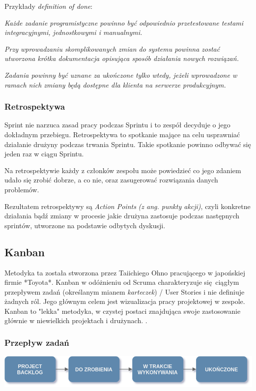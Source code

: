 \documentclass{article}
\begin{document}
Przykłady \textit{definition of done}:
\begin{center}
    \textit{Każde zadanie programistyczne powinno być odpowiednio przetestowane testami integracyjnymi, jednostkowymi i manualnymi.}

    \textit{Przy wprowadzaniu skomplikowanych zmian do systemu powinna zostać utworzona krótka dokumentacja opisująca sposób działania nowych rozwiązań.}

    \textit{Zadania powinny być uznane za ukończone tylko wtedy, jeżeli wprowadzone w ramach nich zmiany będą dostępne dla klienta na serwerze produkcyjnym.}
\end{center}

\subsubsection*{Retrospektywa}
Sprint nie narzuca zasad pracy podczas Sprintu i to zespół decyduje o jego dokładnym przebiegu. Retrospektywa to spotkanie mające na celu usprawniać działanie drużyny podczas trwania Sprintu. Takie spotkanie powinno odbywać się jeden raz w ciągu Sprintu.

Na retrospektywie każdy z członków zespołu może powiedzieć co jego zdaniem udało się zrobić dobrze, a co nie, oraz zasugerować rozwiązania danych problemów.

Rezultatem retrospektywy są \textit{Action Points} \textit{(z ang. punkty akcji)}, czyli konkretne działania bądź zmiany w procesie jakie drużyna zastosuje podczas następnych sprintów, utworzone na podstawie odbytych dyskusji.

\subsection{Kanban}
Metodyka ta została stworzona przez Taiichiego Ohno pracującego w japońskiej firmie *Toyota*. \cite{kanban}Kanban w odóżnieniu od Scruma charakteryzuje się ciągłym przepływem zadań (określanym mianem \textit{karteczek}) / User Stories i nie definiuje żadnych ról. Jego głównym celem jest wizualizacja pracy projektowej w zespole. Kanban to "lekka" metodyka, w czystej postaci znajdująca swoje zastosowanie głównie w niewielkich projektach i drużynach. \cite{kanban2}.

\subsubsection{Przepływ zadań}

\begin{center}
    \includegraphics[scale=0.35]{kanban.png}
\end{center}
\end{document}
